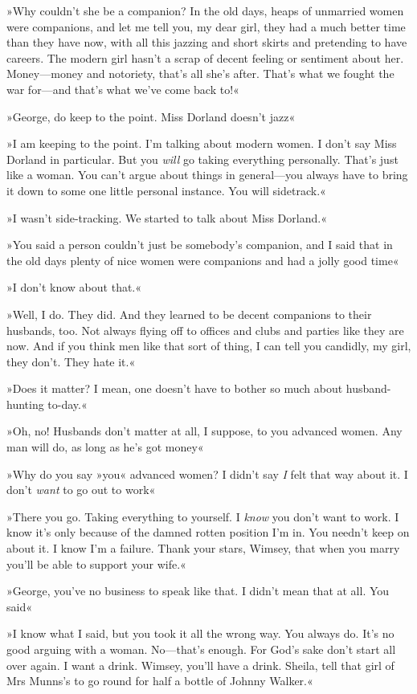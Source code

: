 »Why couldn't she be a companion? In the old days, heaps of unmarried women were companions, and let me tell you, my dear girl, they had a much better time than they have now, with all this jazzing and short skirts and pretending to have careers. The modern girl hasn't a scrap of decent feeling or sentiment about her. Money—money and notoriety, that's all she's after. That's what we fought the war for—and that's what we've come back to!«

»George, do keep to the point. Miss Dorland doesn't jazz\longdash«

»I am keeping to the point. I'm talking about modern women. I don't say Miss Dorland in particular. But you \textit{will} go taking everything personally. That's just like a woman. You can't argue about things in general—you always have to bring it down to some one little personal instance. You will sidetrack.«

»I wasn't side-tracking. We started to talk about Miss Dorland.«

»You said a person couldn't just be somebody's companion, and I said that in the old days plenty of nice women were companions and had a jolly good time\longdash«

»I don't know about that.«

»Well, I do. They did. And they learned to be decent companions to their husbands, too. Not always flying off to offices and clubs and parties like they are now. And if you think men like that sort of thing, I can tell you candidly, my girl, they don't. They hate it.«

»Does it matter? I mean, one doesn't have to bother so much about husband-hunting to-day.«

»Oh, no! Husbands don't matter at all, I suppose, to you advanced women. Any man will do, as long as he's got money\longdash«

»Why do you say »you« advanced women? I didn't say \textit{I} felt that way about it. I don't \textit{want} to go out to work\longdash«

»There you go. Taking everything to yourself. I \textit{know} you don't want to work. I know it's only because of the damned rotten position I'm in. You needn't keep on about it. I know I'm a failure. Thank your stars, Wimsey, that when you marry you'll be able to support your wife.«

»George, you've no business to speak like that. I didn't mean that at all. You said\longdash«

»I know what I said, but you took it all the wrong way. You always do. It's no good arguing with a woman. No—that's enough. For God's sake don't start all over again. I want a drink. Wimsey, you'll have a drink. Sheila, tell that girl of Mrs Munns's to go round for half a bottle of Johnny Walker.«

